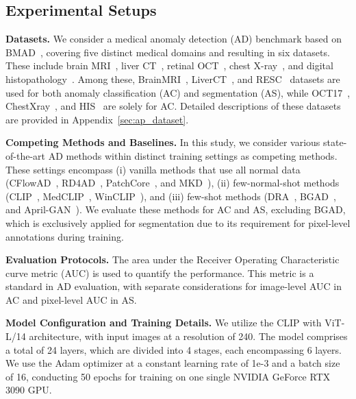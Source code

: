 \subsection{Experimental Setups}
\noindent\textbf{Datasets.}
We consider a medical anomaly detection (AD) benchmark based on BMAD~\cite{bao2023bmad}, covering five distinct medical domains and resulting in six datasets. These include brain MRI~\cite{baid2021rsna,bakas2017advancing,menze2014multimodal}, liver CT~\cite{landman2015miccai,bilic2023liver}, retinal OCT~\cite{hu2019automated,kermany2018identifying}, chest X-ray~\cite{wang2017chestx}, and digital histopathology~\cite{bejnordi2017diagnostic}. Among these, BrainMRI~\cite{baid2021rsna,bakas2017advancing,menze2014multimodal}, LiverCT~\cite{landman2015miccai,bilic2023liver}, and RESC~\cite{hu2019automated} datasets are used for both anomaly classification (AC) and segmentation (AS), while OCT17~\cite{kermany2018identifying}, ChestXray~\cite{wang2017chestx}, and HIS~\cite{bejnordi2017diagnostic} are solely for AC. Detailed descriptions of these datasets are provided in Appendix~\ref{sec:ap_dataset}.

\noindent\textbf{Competing Methods and Baselines.}
In this study, we consider various state-of-the-art AD methods within distinct training settings as competing methods. These settings encompass (i) vanilla methods that use all normal data  (CFlowAD~\cite{gudovskiy2022cflow}, RD4AD~\cite{deng2022anomaly}, PatchCore~\cite{patchcore}, and MKD~\cite{MKD}), (ii) few-normal-shot methods (CLIP~\cite{openclip}, MedCLIP~\cite{wang2022medclip}, WinCLIP~\cite{winclip}), and (iii) few-shot methods (DRA~\cite{DRA}, BGAD~\cite{BGAD}, and April-GAN~\cite{chen2023zero}). We evaluate these methods for AC and AS, excluding BGAD, which is exclusively applied for segmentation due to its requirement for pixel-level annotations during training. 

\noindent\textbf{Evaluation Protocols.} 
The area under the Receiver Operating Characteristic curve metric (AUC) is used to quantify the performance. This metric is a standard in AD evaluation, with separate considerations for image-level AUC in AC and pixel-level AUC in AS.

\noindent\textbf{Model Configuration and Training Details.}
We utilize the CLIP with ViT-L/14 architecture, with input images at a resolution of 240. The model comprises a total of 24 layers, which are divided into 4 stages, each encompassing 6 layers. We use the Adam optimizer at a constant learning rate of 1e-3 and a batch size of 16, conducting 50 epochs for training on one single NVIDIA GeForce RTX 3090 GPU.

